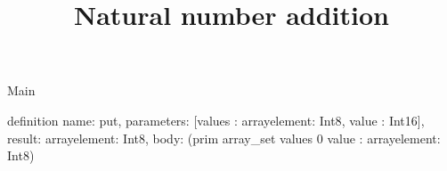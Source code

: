 \begin{lexlean}{Main}
\title{Natural number addition}
\begin{semanticmodule}
definition{
  name: put,
  parameters: [values : array{element: Int8}, value : Int16],
  result: array{element: Int8},
  body: (prim array_set values 0 value : array{element: Int8})
}
\end{semanticmodule}
\end{lexlean}
